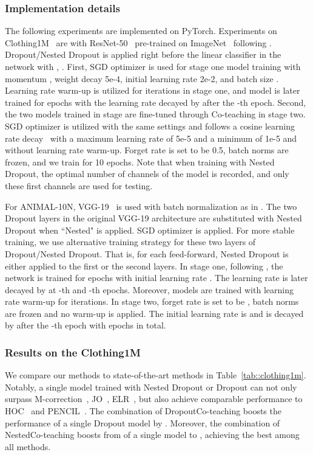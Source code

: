 \documentclass[journal]{IEEEtran}
\begin{document}
\subsubsection{Implementation details}
The following experiments are implemented on PyTorch. 
Experiments on Clothing1M~\cite{xiao2015learning} are with ResNet-50~\cite{he2016deep} pre-trained on ImageNet~\cite{deng2009imagenet} following \cite{yi2019probabilistic,li2020dividemix,li2019learning}. 
Dropout/Nested Dropout is applied right before the linear classifier in the network with , .
First, SGD optimizer is used for stage one model training with momentum , weight decay 5e-4, initial learning rate 2e-2, and batch size . 
Learning rate warm-up is utilized for  iterations in stage one, and model is later trained for  epochs with the learning rate decayed by  after the -th epoch.
Second, the two models trained in stage are fine-tuned through Co-teaching in stage two.
SGD optimizer is utilized with the same settings and follows a cosine learning rate decay~\cite{loshchilov2016sgdr} with a maximum learning rate
of 5e-5 and a minimum of 1e-5 and without learning rate warm-up. 
Forget rate  is set to be 0.5, batch norms are frozen, and we train for 10 epochs.
Note that when training with Nested Dropout, 
the optimal number of channels  of the model is recorded, and only these first  channels are used for testing.

For ANIMAL-10N, VGG-19~\cite{simonyan2014very} is used with batch normalization \cite{ioffe2015batch} as in \cite{song2019selfie}. 
The two Dropout layers in the original VGG-19 architecture are substituted with Nested Dropout when ``Nested" is applied.
SGD optimizer is applied.
For more stable training, we use alternative training strategy for these two layers of Dropout/Nested Dropout.
That is, for each feed-forward, Nested Dropout is either applied to the first or the second layers.
In stage one, following \cite{song2019selfie}, the network is trained for  epochs with initial learning rate .
The learning rate is later decayed by  at -th and -th epochs.
Moreover,  models are trained with learning rate warm-up for  iterations. 
In stage two, forget rate  is set to be , batch norms are frozen and no warm-up is applied.
The initial learning rate is  and is decayed by  after the -th epoch with  epochs in total. 


\subsubsection{Results on the Clothing1M~\cite{xiao2015learning}} 
We compare our methods to state-of-the-art methods in Table~\ref{tab::clothing1m}. 
Notably, a single model trained with Nested Dropout or Dropout can not only surpass M-correction~\cite{arazo2019unsupervised}, JO~\cite{tanaka2018joint}, ELR~\cite{liu2020early}, but also
achieve comparable performance to HOC~\cite{zhu2021clusterability} and PENCIL~\cite{yi2019probabilistic}. 
The combination of DropoutCo-teaching boosts the performance of a single Dropout model by .
Moreover, the combination of NestedCo-teaching boosts from  of a single model to , achieving the best among all methods.
\end{document}
